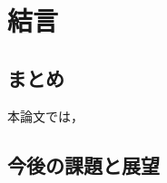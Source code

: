 \section{結言}
\label{chap:conclusion}

\subsection{まとめ}
\label{summary}
本論文では，

\subsection{今後の課題と展望}
\label{future_work}

\newpage